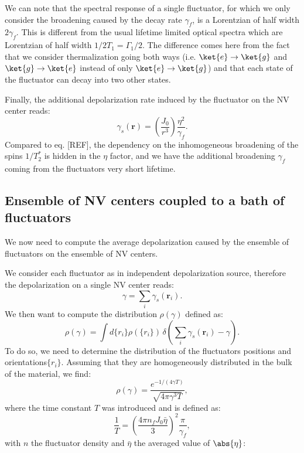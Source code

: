 \documentclass[a4paper,11pt]{report}
\begin{document}
We can note that the spectral response of a single fluctuator, for which we only consider the broadening caused by the decay rate $\gamma_f$, is a Lorentzian of half width $2\gamma_f$. This is different from the usual lifetime limited optical spectra which are Lorentzian of half width $1/2T_1=\Gamma_1/2$. The difference comes here from the fact that we consider thermalization going both ways (i.e. $\ket{e} \to \ket{g}$ and $\ket{g} \to \ket{e}$ instead of only $\ket{e} \to \ket{g}$) and that each state of the fluctuator can decay into two other states.

Finally, the additional depolarization rate induced by the fluctuator on the NV center reads:
\begin{equation}
\gamma_s(\mathbf{r})=\left(\frac{J_0}{r^3}\right) \frac{\eta^2}{\gamma_f}.
\end{equation}
Compared to eq. [REF], the dependency on the inhomogeneous broadening of the spins $1/T_2^*$ is hidden in the $\eta$ factor, and we have the additional broadening $\gamma_f$ coming from the fluctuators very short lifetime.

\subsection{Ensemble of NV centers coupled to a bath of fluctuators}

We now need to compute the average depolarization caused by the ensemble of fluctuators on the ensemble of NV centers.

We consider each fluctuator as in independent depolarization source, therefore the depolarization on a single NV center reads: 
\begin{equation}
\gamma=\sum_i \gamma_s(\mathbf{r}_i).
\end{equation}
We then want to compute the distribution $\rho(\gamma)$ defined as:
\begin{equation}
\rho(\gamma)=\int d\{r_i\} \rho(\{r_i\})\, \delta \left( \sum_i \gamma_s(\mathbf{r}_i) - \gamma \right).
\end{equation}
To do so, we need to determine the distribution of the fluctuators positions and orientations$\{r_i\}$. Assuming that they are homogeneously distributed in the bulk of the material, we find:
\begin{equation}
\rho(\gamma)=\frac{e^{-1/(4\gamma T)}}{\sqrt{4\pi \gamma^3 T}},
\end{equation}
where the time constant $T$ was introduced and is defined as:
\begin{equation}
\frac{1}{T}=\left(\frac{4\pi n_fJ_0\bar \eta}{3}\right)^2 \frac{\pi}{\gamma_f},
\label{eq 1/T}
\end{equation}
with $n$ the fluctuator density and $\bar \eta$ the averaged value of $\abs{\eta}$: 
\end{document}
